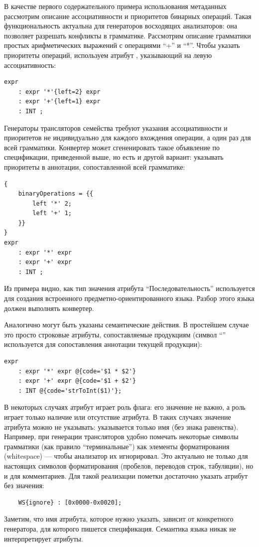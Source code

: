 В качестве первого содержательного примера использования метаданных рассмотрим описание ассоциативности и приоритетов бинарных операций. Такая функциональность актуальна для генераторов восходящих анализаторов: она позволяет разрешать конфликты в грамматике. Рассмотрим описание грамматики простых арифметических выражений с операциями ``+'' и ``*''. Чтобы указать приоритеты операций, используем атрибут , указывающий на левую ассоциативность:
\begin{lstlisting}
expr
	: expr '*'{left=2} expr
	: expr '+'{left=1} expr
	: INT ;
\end{lstlisting}
Генераторы трансляторов семейства  требуют указания ассоциативности и приоритетов не индивидуально для каждого вхождения операции, а один раз для всей грамматики. Конвертер может сгененировать такое объявление по спецификации, приведенной выше, но есть и другой вариант: указывать приоритеты в аннотации, сопоставленной всей грамматике:
\begin{lstlisting}
{
	binaryOperations = {{
		left '*' 2;
		left '+' 1;
	}}
}
expr
	: expr '*' expr
	: expr '+' expr
	: INT ;
\end{lstlisting}
Из примера видно, как тип значения атрибута ``Последовательность'' используется для создания встроенного предметно-ориентированного языка. Разбор этого языка должен выполнять конвертер.

Аналогично могут быть указаны семантические действия. В простейшем случае это просто строковые атрибуты, сопоставляемые продукциям (символ ``'' используется для сопоставления аннотации текущей продукции):
\begin{lstlisting}
expr
	: expr '*' expr @{code='$1 * $2'}
	: expr '+' expr @{code='$1 + $2'}
	: INT @{code='strToInt($1)'};
\end{lstlisting}%

В некоторых случаях атрибут играет роль флага: его значение не важно, а роль играет только наличие или отсутствие атрибута. В таких случаях значение атрибута можно не указывать: указывается только имя (без знака равенства). Например, при генерации трансляторов удобно помечать некоторые символы грамматики (как правило ``терминальные'') как элементы форматирования (whitespace) --- чтобы анализатор их игнорировал. Это актуально не только для настоящих символов форматирования (пробелов, переводов строк, табуляции), но и для комментариев. Для такой реализации пометки достаточно указать атрибут без значения:
\begin{lstlisting}
	WS{ignore} : [0x0000-0x0020];
\end{lstlisting}
Заметим, что имя атрибута, которое нужно указать, зависит от конкретного генератора, для которого пишется спецификация. Семантика языка  никак не интерпретирует атрибуты.

